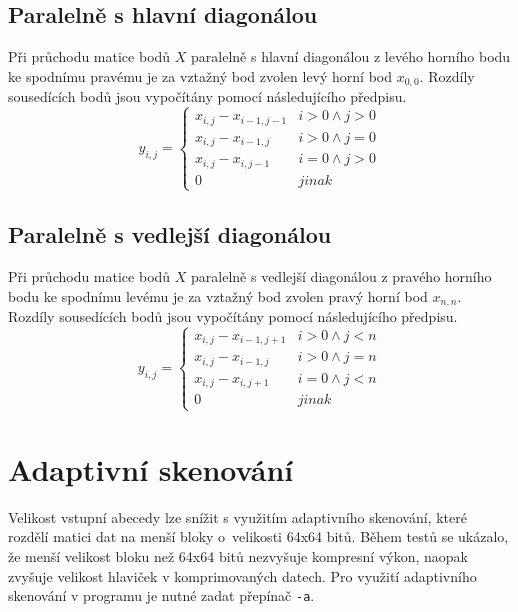 \documentclass[a4paper, 11pt, fleqn]{scrartcl}
\begin{document}
    \subsection{Paralelně s hlavní diagonálou}
      Při průchodu matice bodů $X$ paralelně s hlavní diagonálou z levého horního bodu ke spodnímu pravému je za vztažný bod zvolen levý horní bod $x_{0,0}$. Rozdíly sousedících bodů jsou vypočítány pomocí následujícího předpisu.
      $$
      y_{i,j} = \begin{cases}
                  x_{i,j} - x_{i-1,j-1}   & i > 0 \land j > 0\\
                  x_{i,j} - x_{i-1,j}     & i > 0 \land j = 0\\
                  x_{i,j} - x_{i,j-1}     & i = 0 \land j > 0\\
                  0                       & jinak
                \end{cases}
      $$

    \subsection{Paralelně s vedlejší diagonálou}
      Při průchodu matice bodů $X$ paralelně s vedlejší diagonálou z pravého horního bodu ke spodnímu levému je za vztažný bod zvolen pravý horní bod $x_{n,n}$. Rozdíly sousedících bodů jsou vypočítány pomocí následujícího předpisu.
      $$
      y_{i,j} = \begin{cases}
                  x_{i,j} - x_{i-1,j+1}   & i > 0 \land j < n\\
                  x_{i,j} - x_{i-1,j}     & i > 0 \land j = n\\
                  x_{i,j} - x_{i,j+1}     & i = 0 \land j < n\\
                  0                       & jinak
                \end{cases}
      $$

    \section{Adaptivní skenování}
      Velikost vstupní abecedy lze snížit s využitím adaptivního skenování, které rozdělí matici dat na menší bloky o~velikosti 64x64 bitů. Během testů se ukázalo, že menší velikost bloku než 64x64 bitů nezvyšuje kompresní výkon, naopak zvyšuje velikost hlaviček v komprimovaných datech. Pro využití adaptivního skenování v programu je nutné zadat přepínač \texttt{-a}.
\end{document}

